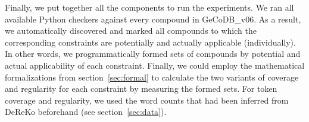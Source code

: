 \documentclass[10pt, a4paper]{article}
\begin{document}










Finally, we put together all the components to run the experiments. We ran all available Python checkers against every compound in GeCoDB\_v06. As a result, we automatically discovered and marked all compounds to which the corresponding constraints are potentially and actually applicable (individually). In other words, we programmatically formed sets of compounds by potential and actual applicability of each constraint. Finally, we could employ the mathematical formalizations from section~\ref{sec:formal} to calculate the two variants of coverage and regularity for each constraint by measuring the formed sets. For token coverage and regularity, we used the word counts that had been inferred from DeReKo beforehand (see section~\ref{sec:data}).
\end{document}
